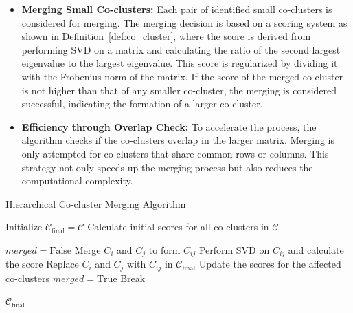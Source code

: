 \documentclass[journal]{IEEEtran}
\begin{document}
\begin{itemize}
  \item \textbf{Merging Small Co-clusters:} Each pair of identified small co-clusters is considered for merging. The merging decision is based on a scoring system as shown in Definition~\ref{def:co_cluster}, where the score is derived from performing SVD on a matrix and calculating the ratio of the second largest eigenvalue to the largest eigenvalue. This score is regularized by dividing it with the Frobenius norm of the matrix. If the score of the merged co-cluster is not higher than that of any smaller co-cluster, the merging is considered successful, indicating the formation of a larger co-cluster.
  \item \textbf{Efficiency through Overlap Check:} To accelerate the process, the algorithm checks if the co-clusters overlap in the larger matrix. Merging is only attempted for co-clusters that share common rows or columns. This strategy not only speeds up the merging process but also reduces the computational complexity.
\end{itemize}

\begin{algorithm}[!t]
  \caption{Hierarchical Co-cluster Merging Algorithm}\label{alg:hierarchical_merging}
  \begin{algorithmic}[1]

    \STATE Initialize $\mathcal{C}_{\text{final}} = \mathcal{C}$
    \STATE Calculate initial scores for all co-clusters in $\mathcal{C}$

    \STATE $merged = \text{False}$
    \STATE Merge $C_i$ and $C_j$ to form $C_{ij}$
    \STATE Perform SVD on $C_{ij}$ and calculate the score
    \STATE Replace $C_i$ and $C_j$ with $C_{ij}$ in $\mathcal{C}_{\text{final}}$
    \STATE Update the scores for the affected co-clusters
    \STATE $merged = \text{True}$
    \ENDIF
    \ENDIF
    \ENDFOR
    \STATE Break
    \ENDIF
    \ENDWHILE

    \RETURN $\mathcal{C}_{\text{final}}$
  \end{algorithmic}
\end{algorithm}
\end{document}
